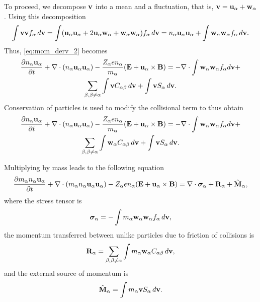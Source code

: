 \documentclass[a4paper,11pt]{report}
\begin{document}
To proceed, we decompose $\mathbf{v}$ into a mean and a fluctuation, that is, $\mathbf{v} = \mathbf{u}_\alpha + \mathbf{w}_\alpha$. Using this decomposition 
\begin{equation}
\label{eq:identity_vv}
\int \mathbf{v} \mathbf{v} f_\alpha \, d\mathbf{v} = \int ( \mathbf{u}_\alpha \mathbf{u}_\alpha + 2 \mathbf{u}_\alpha \mathbf{w}_\alpha + \mathbf{w}_\alpha \mathbf{w}_\alpha) f_\alpha \, d\mathbf{v} = n_\alpha \mathbf{u}_\alpha \mathbf{u}_\alpha + \int \mathbf{w}_\alpha \mathbf{w}_\alpha f_\alpha \, d\mathbf{v}.
\end{equation}
Thus, \cref{eq:mom_derv_2} becomes
\begin{multline}
\label{eq:mom_derv_3}
\frac{\partial n_\alpha \mathbf{u}_\alpha}{\partial t} + \nabla \cdot \left ( n_\alpha \mathbf{u}_\alpha \mathbf{u}_\alpha \right) - \frac{Z_\alpha e n_\alpha}{m_\alpha} ( \mathbf{E} + \mathbf{u}_\alpha \times \mathbf{B} ) = -\nabla \cdot \int \mathbf{w}_\alpha \mathbf{w}_\alpha f_\alpha d\mathbf{v} + \\
\sum_{\beta, \beta \ne \alpha} \int \mathbf{v} C_{\alpha \beta} \, d\mathbf{v} + \int \mathbf{v} S_\alpha \, d\mathbf{v}.
\end{multline}
Conservation of particles is used to modify the collisional term to thus obtain
\begin{multline}
\label{eq:mom_derv_4}
\frac{\partial n_\alpha \mathbf{u}_\alpha}{\partial t} + \nabla \cdot \left ( n_\alpha \mathbf{u}_\alpha \mathbf{u}_\alpha \right) - \frac{Z_\alpha e n_\alpha}{m_\alpha} ( \mathbf{E} + \mathbf{u}_\alpha \times \mathbf{B} ) = -\nabla \cdot \int \mathbf{w}_\alpha \mathbf{w}_\alpha f_\alpha d\mathbf{v} + \\
\sum_{\beta, \beta \ne \alpha} \int \mathbf{w}_\alpha C_{\alpha \beta} \, d\mathbf{v} + \int \mathbf{v} S_\alpha \, d\mathbf{v}.
\end{multline}

Multiplying by mass leads to the following equation
\begin{equation}
\label{eq:mom_derv_5}
\frac{\partial m_\alpha n_\alpha \mathbf{u}_\alpha}{\partial t} + \nabla \cdot \left ( m_\alpha n_\alpha \mathbf{u}_\alpha \mathbf{u}_\alpha \right) - Z_\alpha e n_\alpha ( \mathbf{E} + \mathbf{u}_\alpha \times \mathbf{B} ) = \nabla \cdot \boldsymbol{\sigma}_\alpha + \mathbf{R}_\alpha + \hat{\mathbf{M}}_\alpha,
\end{equation}
where the stress tensor is
\begin{equation}
\boldsymbol{\sigma}_\alpha = -\int m_\alpha \mathbf{w}_\alpha \mathbf{w}_\alpha f_\alpha \, d\mathbf{v},
\end{equation}
the momentum transferred between unlike particles due to friction of collisions is
\begin{equation}
\mathbf{R}_\alpha = \sum_{\beta, \beta \ne \alpha} \int m_\alpha \mathbf{w}_\alpha C_{\alpha \beta} \, d\mathbf{v},
\end{equation}
and the external source of momentum is
\begin{equation}
\hat{\mathbf{M}}_\alpha = \int m_\alpha \mathbf{v} S_\alpha \, d\mathbf{v}.
\end{equation}
 
\end{document}
